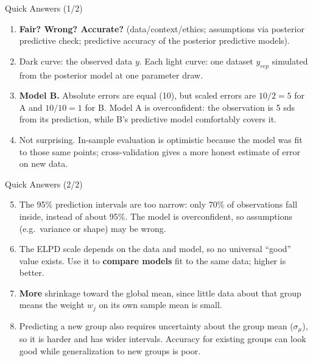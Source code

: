 \documentclass[aspectratio=43,11pt]{beamer}
\begin{document}
{
\begin{frame}{Quick Answers (1/2)}
\small
  \begin{enumerate}
    \item \textbf{Fair? Wrong? Accurate?} (data/context/ethics; assumptions via posterior predictive check; predictive accuracy of the posterior predictive models).
    \item Dark curve: the observed data $y$. Each light curve: one dataset $y_{rep}$ simulated from the posterior model at one parameter draw.
    \item \textbf{Model B.} Absolute errors are equal (10), but scaled errors are $10/2=5$ for A and $10/10=1$ for B. Model A is overconfident: the observation is 5 sds from its prediction, while B's predictive model comfortably covers it.
    \item Not surprising. In-sample evaluation is optimistic because the model was fit to those same points; cross-validation gives a more honest estimate of error on new data.
  \end{enumerate}
\end{frame}

\begin{frame}{Quick Answers (2/2)}
\small
  \begin{enumerate}
    \setcounter{enumi}{4}
    \item The 95\% prediction intervals are too narrow: only 70\% of observations fall inside, instead of about 95\%. The model is overconfident, so assumptions (e.g.\ variance or shape) may be wrong.
    \item The ELPD scale depends on the data and model, so no universal ``good'' value exists. Use it to \textbf{compare models} fit to the same data; higher is better.
    \item \textbf{More} shrinkage toward the global mean, since little data about that group means the weight $w_j$ on its own sample mean is small.
    \item Predicting a new group also requires uncertainty about the group mean ($\sigma_\mu$), so it is harder and has wider intervals. Accuracy for existing groups can look good while generalization to new groups is poor.
  \end{enumerate}
\end{frame}
}
\end{document}
